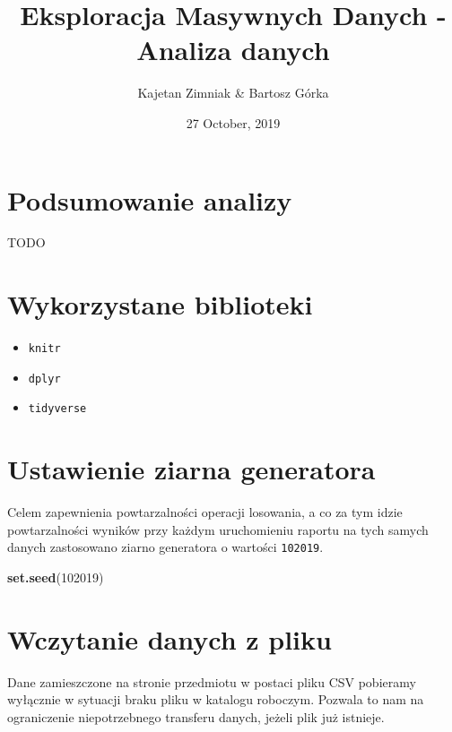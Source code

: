 \documentclass[]{article}
\title{Eksploracja Masywnych Danych - Analiza danych}
\author{Kajetan Zimniak \& Bartosz Górka}
\date{27 October, 2019}
\newenvironment{Shaded}{\begin{snugshade}}{\end{snugshade}}
\newcommand{\DecValTok}[1]{\textcolor[rgb]{0.00,0.00,0.81}{#1}}
\newcommand{\KeywordTok}[1]{\textcolor[rgb]{0.13,0.29,0.53}{\textbf{#1}}}
\newcommand{\NormalTok}[1]{#1}
\providecommand{\tightlist}{%
  \setlength{\itemsep}{0pt}\setlength{\parskip}{0pt}}
\begin{document}
\maketitle

{
\setcounter{tocdepth}{2}
\tableofcontents
}
\hypertarget{podsumowanie-analizy}{%
\section{Podsumowanie analizy}\label{podsumowanie-analizy}}

TODO

\hypertarget{wykorzystane-biblioteki}{%
\section{Wykorzystane biblioteki}\label{wykorzystane-biblioteki}}

\begin{itemize}
\tightlist
\item
  \texttt{knitr}
\item
  \texttt{dplyr}
\item
  \texttt{tidyverse}
\end{itemize}

\hypertarget{ustawienie-ziarna-generatora}{%
\section{Ustawienie ziarna
generatora}\label{ustawienie-ziarna-generatora}}

Celem zapewnienia powtarzalności operacji losowania, a co za tym idzie
powtarzalności wyników przy każdym uruchomieniu raportu na tych samych
danych zastosowano ziarno generatora o wartości \texttt{102019}.

\begin{Shaded}
\begin{Highlighting}[]
\KeywordTok{set.seed}\NormalTok{(}\DecValTok{102019}\NormalTok{)}
\end{Highlighting}
\end{Shaded}

\hypertarget{wczytanie-danych-z-pliku}{%
\section{Wczytanie danych z pliku}\label{wczytanie-danych-z-pliku}}

Dane zamieszczone na stronie przedmiotu w postaci pliku CSV pobieramy
wyłącznie w sytuacji braku pliku w katalogu roboczym. Pozwala to nam na
ograniczenie niepotrzebnego transferu danych, jeżeli plik już istnieje.
\end{document}
